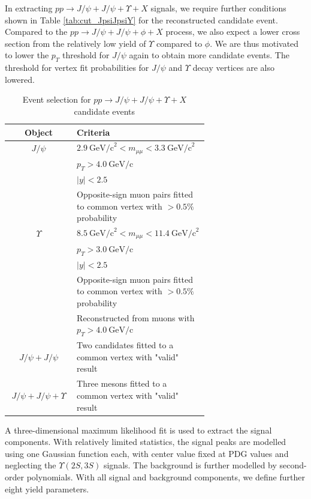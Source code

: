 \documentclass[10pt,twocolumn]{article}
\newcommand*{\GeVc}{~\text{GeV/c}}
\newcommand*{\GeVcs}{~\text{GeV/c}^2}
\begin{document}
In extracting $pp\to J/\psi+J/\psi+\Upsilon+X$ signals, we require further conditions shown in Table \ref{tab:cut_JpsiJpsiY} for the reconstructed candidate event. Compared to the $pp\to J/\psi+J/\psi+\phi+X$ process, we also expect a lower cross section from the relatively low yield of $\Upsilon$ compared to $\phi$. We are thus motivated to lower the $p_T$ threshold for $J/\psi$ again to obtain more candidate events. The threshold for vertex fit probabilities for $J/\psi$ and $\Upsilon$ decay vertices are also lowered.

\begin{table}[]
    \centering
    \caption{Event selection for $pp\to J/\psi+J/\psi+\Upsilon+X$ candidate events\\}
    \begin{tabular}{c p{0.66\linewidth}}
        \toprule
        \textbf{Object} & \textbf{Criteria} \\
        \midrule
        $J/\psi$ & $2.9 \GeVcs < m_{\mu\mu} < 3.3 \GeVcs$ \\
                 & $p_T > 4.0\GeVc$ \\
                 & $|y| < 2.5$ \\
                 & Opposite-sign muon pairs fitted to common vertex with $> 0.5\%$ probability \\
                 \midrule
        $\Upsilon$ & $8.5\GeVcs < m_{\mu\mu} < 11.4 \GeVcs$ \\
                 & $p_T > 3.0\GeVc$ \\
                 & $|y| < 2.5$ \\
                 & Opposite-sign muon pairs fitted to common vertex with $> 0.5\%$ probability \\
                 & Reconstructed from muons with $p_T>4.0\GeVc$ \\
                 \midrule
        $J/\psi+J/\psi$ & Two candidates fitted to a common vertex with "valid" result \\
        \midrule
        $J/\psi+J/\psi+\Upsilon$ & Three mesons fitted to a common vertex with "valid" result \\
        \bottomrule
    \end{tabular}
    \label{tab:cut_JpsiJpsiPhi}
\end{table}

A three-dimensional maximum likelihood fit is used to extract the signal components. With relatively limited statistics, the signal peaks are modelled using one Gaussian function each, with center value fixed at PDG values \cite{PDG2020} and neglecting the $\Upsilon(2S,3S)$ signals. The background is further modelled by second-order polynomials. With all signal and background components, we define further eight yield parameters.
\end{document}
